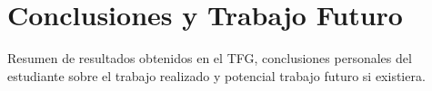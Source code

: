 \chapter{Conclusiones y Trabajo Futuro}

Resumen de resultados obtenidos en el TFG, conclusiones personales del
estudiante sobre el trabajo realizado y potencial trabajo futuro si
existiera.

